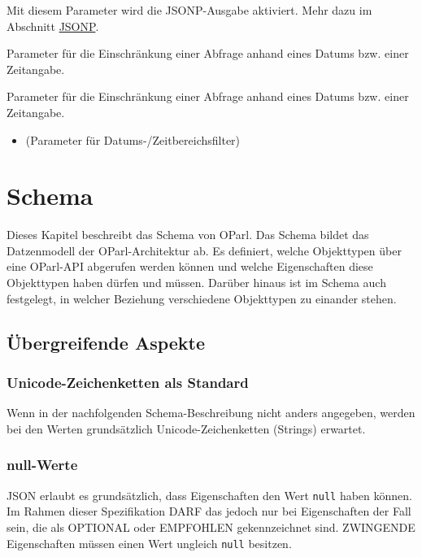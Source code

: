 \documentclass[,a4paper]{article}
\begin{document}
\begin{description}
\itemsep1pt\parskip0pt
\item[callback:]
Mit diesem Parameter wird die JSONP-Ausgabe aktiviert. Mehr dazu im
Abschnitt \hyperref[jsonp]{JSONP}.
\item[startdate:]
Parameter für die Einschränkung einer Abfrage anhand eines Datums bzw.
einer Zeitangabe.
\item[enddate:]
Parameter für die Einschränkung einer Abfrage anhand eines Datums bzw.
einer Zeitangabe.
\end{description}

\begin{itemize}
\itemsep1pt\parskip0pt
\item
  (Parameter für Datums-/Zeitbereichsfilter)
\end{itemize}

\section{Schema}\label{schema}

Dieses Kapitel beschreibt das Schema von OParl. Das Schema bildet das
Datzenmodell der OParl-Architektur ab. Es definiert, welche Objekttypen
über eine OParl-API abgerufen werden können und welche Eigenschaften
diese Objekttypen haben dürfen und müssen. Darüber hinaus ist im Schema
auch festgelegt, in welcher Beziehung verschiedene Objekttypen zu
einander stehen.

\subsection{Übergreifende Aspekte}\label{uxfcbergreifende-aspekte}

\subsubsection{Unicode-Zeichenketten als
Standard}\label{unicode-zeichenketten-als-standard}

Wenn in der nachfolgenden Schema-Beschreibung nicht anders angegeben,
werden bei den Werten grundsätzlich Unicode-Zeichenketten (Strings)
erwartet.

\subsubsection{null-Werte}\label{null-werte}

JSON erlaubt es grundsätzlich, dass Eigenschaften den Wert \texttt{null}
haben können. Im Rahmen dieser Spezifikation DARF das jedoch nur bei
Eigenschaften der Fall sein, die als OPTIONAL oder EMPFOHLEN
gekennzeichnet sind. ZWINGENDE Eigenschaften müssen einen Wert ungleich
\texttt{null} besitzen.
\end{document}
